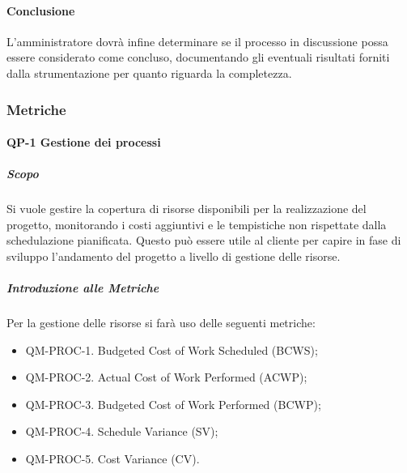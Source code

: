 		\paragraph{Conclusione}
			L'amministratore dovrà infine determinare se il processo in discussione possa essere considerato come concluso, documentando gli eventuali risultati forniti dalla strumentazione per quanto riguarda la completezza.	 		

	\subsubsection{Metriche}
		\paragraph{QP-1 Gestione dei processi}

			\subparagraph{Scopo}
				Si vuole gestire la copertura di risorse disponibili per la realizzazione del progetto, monitorando i costi aggiuntivi e le tempistiche non rispettate dalla schedulazione pianificata. Questo può essere utile al cliente per capire in fase di sviluppo l'andamento del progetto a livello di gestione delle risorse.

			\subparagraph{Introduzione alle Metriche}

				Per la gestione delle risorse si farà uso delle seguenti metriche:

			\begin{itemize}
				\item QM-PROC-1. Budgeted Cost of Work Scheduled (BCWS);
				\item QM-PROC-2. Actual Cost of Work Performed (ACWP);
				\item QM-PROC-3. Budgeted Cost of Work Performed (BCWP);
				\item QM-PROC-4. Schedule Variance (SV);
				\item QM-PROC-5. Cost Variance (CV).
			\end{itemize}

